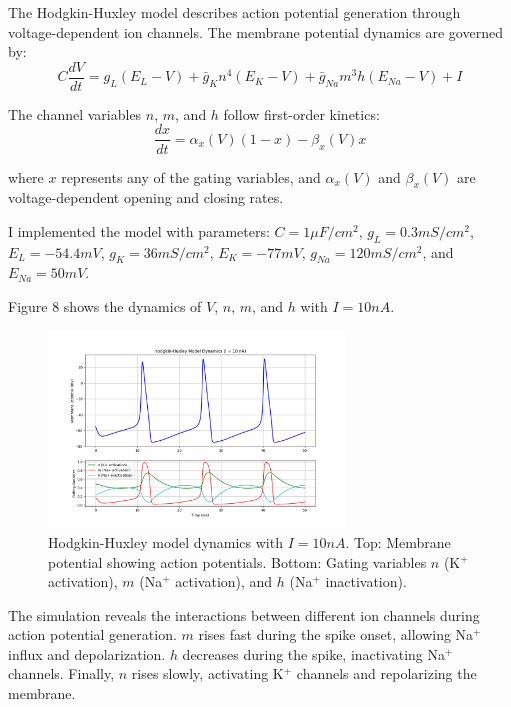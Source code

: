 \documentclass[11pt,a4paper]{article}
\begin{document}
The Hodgkin-Huxley model describes action potential generation through voltage-dependent ion channels. The membrane potential dynamics are governed by:
\begin{equation}
C \frac{dV}{dt} = g_L(E_L - V) + \bar{g}_K n^4(E_K - V) + \bar{g}_{Na}m^3h(E_{Na} - V) + I
\end{equation}

The channel variables $n$, $m$, and $h$ follow first-order kinetics:
\begin{equation}
\frac{dx}{dt} = \alpha_x(V)(1 - x) - \beta_x(V)x
\end{equation}

where $x$ represents any of the gating variables, and $\alpha_x(V)$ and $\beta_x(V)$ are voltage-dependent opening and closing rates.

I implemented the model with parameters: $C = 1\mu F/cm^2$, $g_L = 0.3mS/cm^2$, $E_L = -54.4mV$, $g_K = 36mS/cm^2$, $E_K = -77mV$, $g_{Na} = 120mS/cm^2$, and $E_{Na} = 50mV$.

Figure 8 shows the dynamics of $V$, $n$, $m$, and $h$ with $I = 10nA$.

\begin{figure}[H]
\centering
\includegraphics[width=0.7\textwidth]{fig8.png}
\caption{Hodgkin-Huxley model dynamics with $I = 10nA$. Top: Membrane potential showing action potentials. Bottom: Gating variables $n$ (K$^+$ activation), $m$ (Na$^+$ activation), and $h$ (Na$^+$ inactivation).}
\label{fig:hh_dynamics}
\end{figure}

The simulation reveals the interactions between different ion channels during action potential generation.
$m$ rises fast during the spike onset, allowing Na$^+$ influx and depolarization.
$h$ decreases during the spike, inactivating Na$^+$ channels. Finally,
$n$ rises slowly, activating K$^+$ channels and repolarizing the membrane.
\end{document}
